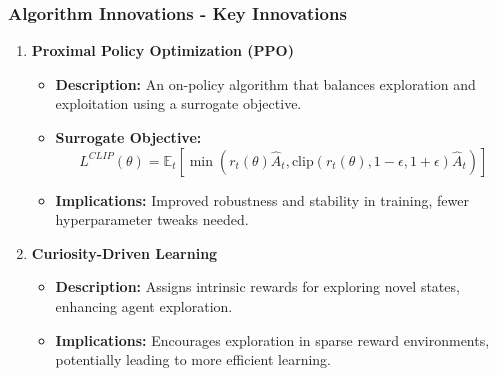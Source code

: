 \documentclass{beamer}
\begin{document}
\begin{frame}[fragile]
    \frametitle{Algorithm Innovations - Key Innovations}
    \begin{enumerate}
        \item \textbf{Proximal Policy Optimization (PPO)}
            \begin{itemize}
                \item \textbf{Description:} An on-policy algorithm that balances exploration and exploitation using a surrogate objective.
                \item \textbf{Surrogate Objective:}
                \begin{equation}
                    L^{CLIP}(\theta) = \mathbb{E}_t \left[ \min\left(r_t(\theta) \hat{A}_t, \text{clip}(r_t(\theta), 1 - \epsilon, 1 + \epsilon) \hat{A}_t\right)\right]
                \end{equation}
                \item \textbf{Implications:} Improved robustness and stability in training, fewer hyperparameter tweaks needed.
            \end{itemize}
        
        \item \textbf{Curiosity-Driven Learning}
            \begin{itemize}
                \item \textbf{Description:} Assigns intrinsic rewards for exploring novel states, enhancing agent exploration.
                \item \textbf{Implications:} Encourages exploration in sparse reward environments, potentially leading to more efficient learning.
            \end{itemize}
    \end{enumerate}
\end{frame}
\end{document}
